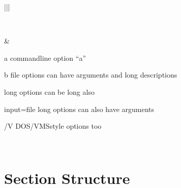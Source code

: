 \documentclass[letterpaper,10pt,english]{sphinxmanual}
\begin{document}
\begin{savenotes}
\begin{tabular}[t]{|*{2}{|}}
\begin{quote}
\begin{description}
\end{description}\end{quote}
\\
\hline
\begin{sphinxVerbatimintable}[commandchars=\\\{\}]
              
           
                
            
      
              
\end{sphinxVerbatimintable}
&\begin{optionlist}{3cm}
\item [\sphinxhyphen{}a]  
command\sphinxhyphen{}line option “a”
\item [\sphinxhyphen{}b file]  
options can have arguments
and long descriptions
\item [\sphinxhyphen{}\sphinxhyphen{}long]  
options can be long also
\item [\sphinxhyphen{}\sphinxhyphen{}input=file]  
long options can also have
arguments
\item [/V]  
DOS/VMS\sphinxhyphen{}style options too
\end{optionlist}
\\
\hline
\end{tabular}
\par
\sphinxattableend\end{savenotes}




\section{Section Structure}
\label{\detokenize{rst-cheatsheet/rst-cheatsheet:section-structure}}
\end{document}
